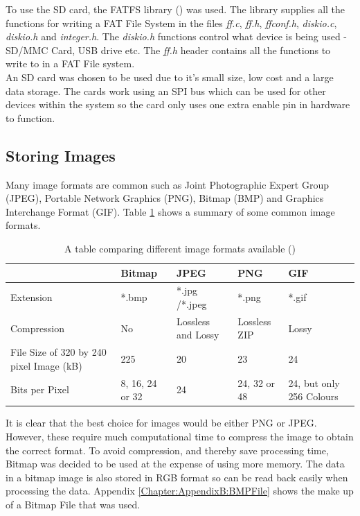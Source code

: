 To use the SD card, the FATFS library (\cite{FATFS}) was used. The library supplies all the functions for writing a FAT File System in the files \textit{ff.c}, \textit{ff.h}, \textit{ffconf.h}, \textit{diskio.c}, \textit{diskio.h} and \textit{integer.h}. The \textit{diskio.h} functions control what device is being used - SD/MMC Card, USB drive etc. The \textit{ff.h} header contains all the functions to write to in a FAT File system. 
\\
An SD card was chosen to be used due to it's small size, low cost and a large data storage. The cards work using an SPI bus which can be used for other devices within the system so the card only uses one extra enable pin in hardware to function. 

\subsection{Storing Images}

Many image formats are common such as Joint Photographic Expert Group (JPEG), Portable Network Graphics (PNG), Bitmap (BMP) and Graphics Interchange Format (GIF). Table \ref{ImageFormats} shows a summary of some common image formats.


\begin{table}
\centering
\begin{tabular}{|p{3cm}| p{3cm}|p{3cm}|p{3cm}|p{3cm}|} \hline
			&	Bitmap 		& 	JPEG			 	&	PNG				& 	GIF \\ \hline
Extension 		& 	*.bmp 		&  	*.jpg /*.jpeg 		& 	*.png				& 	*.gif \\ \hline
Compression 	& 	No 			& 	Lossless  and Lossy		&	Lossless ZIP			&	Lossy	\\\hline
File Size of 320 by 
240 pixel Image (kB) &	225			&	20				&	23				&	24 \\\hline
Bits per Pixel		&	8, 16, 24 or 32	&	24				&	24, 32 or 48 			& 	24, but only 256 Colours \\


\hline
\end{tabular}
\caption{A table comparing different image formats available (\cite{ImageComparison})}
\label{ImageFormats}
\end{table}

It is clear that the best choice for images would be either PNG or JPEG. However, these require much computational time to compress the image to obtain the correct format. To avoid compression, and thereby save processing time, Bitmap was decided to be used at the expense of using more memory. The data in a bitmap image is also stored in RGB format so can be read back easily when processing the data. Appendix \ref{Chapter:AppendixB:BMPFile} shows the make up of a Bitmap File that was used.

